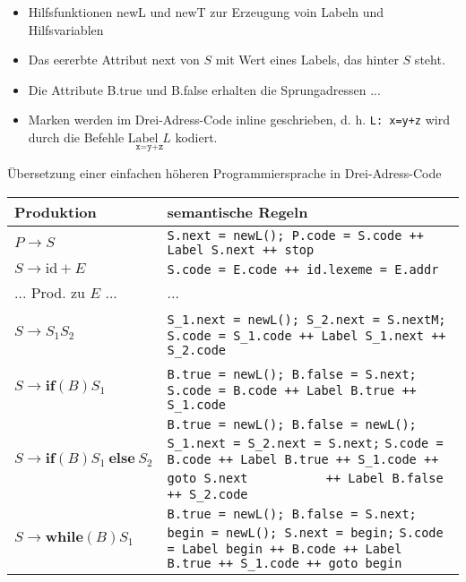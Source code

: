 \begin{itemize}
 \item Hilfsfunktionen newL und newT zur Erzeugung voin Labeln und Hilfsvariablen
 \item Das eererbte Attribut next von $S$ mit Wert eines Labels, das hinter $S$ steht.
 \item Die Attribute B.true und B.false erhalten die Sprungadressen ...
 \item Marken werden im Drei-Adress-Code inline geschrieben, d. h. \texttt{L: x=y+z} wird durch die Befehle $\underset{\texttt{x=y+z}}{\text{Label $L$}}$ kodiert.
\end{itemize}

Übersetzung einer einfachen höheren Programmiersprache in Drei-Adress-Code
\begin{center}
\begin{tabular}{l|p{12.5cm}}
\textbf{Produktion}   & \textbf{semantische Regeln} \\\hline
$P \to S$             & \lstinline$S.next = newL(); P.code = S.code ++ Label S.next ++ stop$ \\\hline
$S \to \text{id} + E$ & \lstinline$S.code = E.code ++ id.lexeme = E.addr$ \\\hline
... Prod. zu $E$ ...  & ... \\\hline
$S \to S_1 S_2$       & \lstinline$S_1.next = newL(); S_2.next = S.nextM;$ \newline
                        \lstinline$        S.code = S_1.code ++ Label S_1.next ++ S_2.code$ \\\hline
$S \to \textbf{if}(B) S_1$ & \lstinline$B.true = newL(); B.false = S.next;$ \newline
                        \lstinline$        S.code = B.code ++ Label B.true ++ S_1.code$ \\\hline
$S \to \textbf{if}(B) S_1\ \textbf{else}\ S_2$ & \lstinline$B.true = newL(); B.false = newL(); S_1.next = S_2.next = S.next;$ \newline
                        \lstinline$S.code = B.code ++ Label B.true ++ S_1.code ++ goto S.next$\newline
                        \lstinline$          ++ Label B.false ++ S_2.code$ \\\hline
$S \to \textbf{while}(B) S_1$ &  \lstinline$B.true = newL(); B.false = S.next; begin = newL(); S.next = begin;$ \newline
                        \lstinline$S.code = Label begin ++ B.code ++ Label B.true ++ S_1.code ++ goto begin$\\\hline
\end{tabular}
\end{center}
